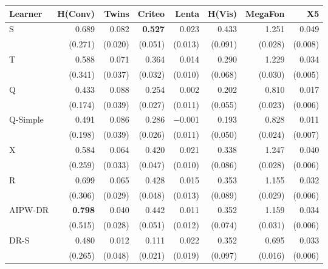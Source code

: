 \begin{tabular}{l|rrrrrrr}
\hline
Learner & H(Conv) & Twins & Criteo & Lenta & H(Vis) & MegaFon & X5 \\
\hline
S & 0.689 & 0.082 & \textbf{0.527} & 0.023 & 0.433 & 1.251 & 0.049 \\
 & \scriptsize (0.271) & \scriptsize (0.020) & \scriptsize (0.051) & \scriptsize (0.013) & \scriptsize (0.091) & \scriptsize (0.028) & \scriptsize (0.008) \\[2pt]
T & 0.588 & 0.071 & 0.364 & 0.014 & 0.290 & 1.229 & 0.034 \\
 & \scriptsize (0.341) & \scriptsize (0.037) & \scriptsize (0.032) & \scriptsize (0.010) & \scriptsize (0.068) & \scriptsize (0.030) & \scriptsize (0.005) \\[2pt]
\hline
Q & 0.433 & 0.088 & 0.254 & 0.002 & 0.202 & 0.810 & 0.017 \\
 & \scriptsize (0.174) & \scriptsize (0.039) & \scriptsize (0.027) & \scriptsize (0.011) & \scriptsize (0.055) & \scriptsize (0.023) & \scriptsize (0.006) \\[2pt]
Q-Simple & 0.491 & 0.086 & 0.286 & $-$0.001 & 0.193 & 0.828 & 0.011 \\
 & \scriptsize (0.198) & \scriptsize (0.039) & \scriptsize (0.026) & \scriptsize (0.011) & \scriptsize (0.050) & \scriptsize (0.024) & \scriptsize (0.007) \\[2pt]
\hline
X & 0.584 & 0.064 & 0.420 & 0.021 & 0.338 & 1.247 & 0.040 \\
 & \scriptsize (0.259) & \scriptsize (0.033) & \scriptsize (0.047) & \scriptsize (0.010) & \scriptsize (0.086) & \scriptsize (0.028) & \scriptsize (0.006) \\[2pt]
R & 0.699 & 0.065 & 0.428 & 0.015 & 0.353 & 1.155 & 0.032 \\
 & \scriptsize (0.306) & \scriptsize (0.029) & \scriptsize (0.048) & \scriptsize (0.013) & \scriptsize (0.089) & \scriptsize (0.029) & \scriptsize (0.006) \\[2pt]
AIPW-DR & \textbf{0.798} & 0.040 & 0.442 & 0.011 & 0.352 & 1.159 & 0.034 \\
 & \scriptsize (0.515) & \scriptsize (0.028) & \scriptsize (0.051) & \scriptsize (0.012) & \scriptsize (0.074) & \scriptsize (0.031) & \scriptsize (0.006) \\[2pt]
\hline
DR-S & 0.480 & 0.012 & 0.111 & 0.022 & 0.352 & 0.695 & 0.033 \\
 & \scriptsize (0.265) & \scriptsize (0.048) & \scriptsize (0.021) & \scriptsize (0.019) & \scriptsize (0.097) & \scriptsize (0.016) & \scriptsize (0.006) \\[2pt]

\end{tabular}
